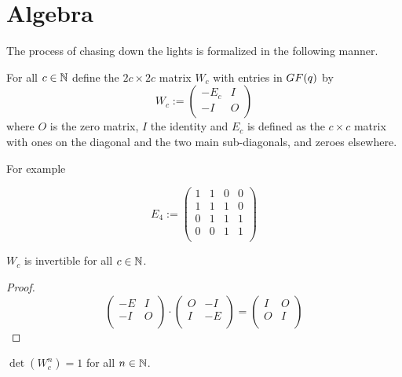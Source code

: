 \section{Algebra}

The process of chasing down the lights is formalized in the following
manner.

For all $c\in\mathbb{N}$ define the $2c\times 2c$ matrix
$W_{c}$ with entries in $GF(q)$ by
\[
W_{c} := \left(
\begin{array}{cc}
  -E_{c} & I \\
  -I    & O \\
\end{array}
\right)
\]
where $O$ is the zero matrix, $I$ the identity and $E_{c}$ is defined
as the $c\times c$ matrix with ones on the diagonal and the two main
sub-diagonals, and zeroes elsewhere.

For example

\[
E_{4} := \left(
\begin{array}{cccc}
  1 & 1 & 0 & 0 \\
  1 & 1 & 1 & 0 \\
  0 & 1 & 1 & 1 \\
  0 & 0 & 1 & 1 \\
\end{array}
\right)
\]

\begin{lemma}
  $W_{c}$ is invertible for all $c\in\mathbb{N}$.
\end{lemma}

\begin{proof}
  \[
  \left(
  \begin{array}{cc}
    -E & I \\
    -I & O \\
  \end{array}
  \right)
  \cdot
  \left(
  \begin{array}{cc}
    O & -I  \\
    I & -E \\
  \end{array}
  \right)
  =
  \left(
  \begin{array}{cc}
    I & O \\
    O & I \\
  \end{array}
  \right)
  \]
\end{proof}


\begin{lemma}
  $\det(W_{c}^{n}) = 1$ for all $n\in\mathbb{N}$.
\end{lemma}

